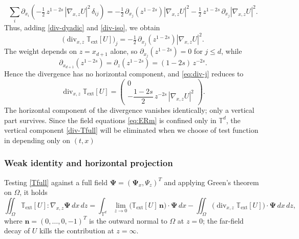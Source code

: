 \documentclass[12pt,a4paper,twoside]{article}
\newcommand{\Div}{\operatorname{div}}
\newcommand{\Grad}{\nabla}
\numberwithin{equation}{section}%
\newcommand{\T}{\mathbb{T}}
\begin{document}
\begin{equation}\label{div-iso}
	\sum_i \partial_{x_i}\!\left( -\tfrac12\, z^{1-2s}\, |\Grad_{x,z} U|^2\, \delta_{ij} \right)
	= -\tfrac12\, \partial_{x_j}\!\left( z^{1-2s} \right) |\Grad_{x,z} U|^2
	- \tfrac12\, z^{1-2s}\, \partial_{x_j} |\Grad_{x,z} U|^2 .
\end{equation}
Thus, adding \eqref{div-dyadic} and \eqref{div-iso}, we obtain
\begin{equation}\label{eq:div-j}
	\big( \Div_{x,z}\mathbb{T}_{\mathrm{ext}}[U] \big)_j
	= -\tfrac12\, \partial_{x_j}\!\left( z^{1-2s} \right) |\Grad_{x,z} U|^2 .
\end{equation}
The weight depends on $z = x_{d+1}$ alone, so $\partial_{x_j}(z^{1-2s}) = 0$ for $j \le d$, while
\[
\partial_{x_{d+1}}\!\left( z^{1-2s} \right) = \partial_z\!\left( z^{1-2s} \right) = (1-2s)\, z^{-2s}.
\]
Hence the divergence has no horizontal component, and \eqref{eq:div-j} reduces to
\begin{equation}\label{div-Tfull}
	\Div_{x,z}\mathbb{T}_{\mathrm{ext}}[U]
	= \begin{pmatrix} 0 \\[2pt] -\dfrac{1-2s}{2}\, z^{-2s}\, |\Grad_{x,z} U|^2 \end{pmatrix}.
\end{equation}
The horizontal component of the divergence vanishes identically; only a vertical part survives. Since the field equations \eqref{eq:ERm} is confined only in $\T^d$, the vertical component \eqref{div-Tfull} will be eliminated when we choose of test function in depending only on $(t,x)$

\subsubsection*{Weak identity and horizontal projection}
\label{sec:stress-weak}

Testing \eqref{Tfull} against a full field $\pmb{\Psi}=(\pmb{\Psi}_x,\Psi_z)^T$ and applying Green's theorem on $\Omega$, it holds
\begin{equation}\label{green}
	\iint_{\Omega} \mathbb{T}_{\mathrm{ext}}[U] : \Grad_{x,z}\pmb{\Psi}\,dx\,dz
	= \int_{\mathbb{T}^d} \lim_{z\to0}\big(\mathbb{T}_{\mathrm{ext}}[U]\,\mathbf{n}\big)\cdot\pmb{\Psi}\,dx
	- \iint_{\Omega} \big(\Div_{x,z}\mathbb{T}_{\mathrm{ext}}[U]\big)\cdot\pmb{\Psi}\,dx\,dz,
\end{equation}
where $\mathbf{n}=(0,\dots,0,-1)^T$ is the outward normal to $\Omega$ at $z=0$; the far-field decay of $U$ kills the contribution at $z=\infty$.
\end{document}
